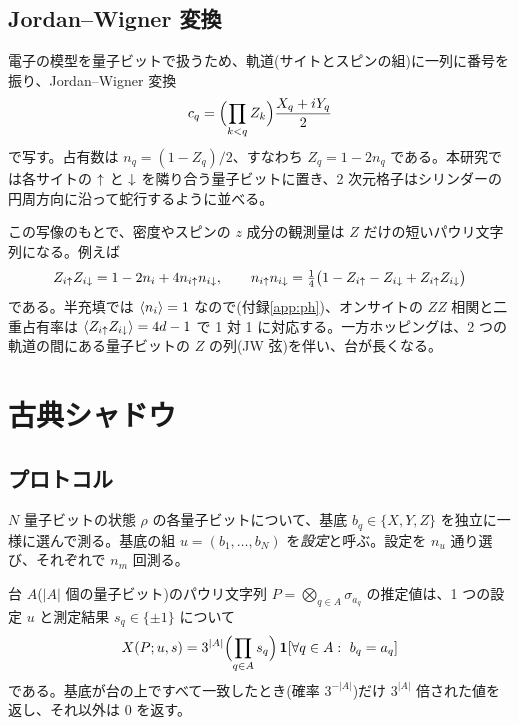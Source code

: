 \subsection{Jordan--Wigner 変換}
\label{sec:jw}
電子の模型を量子ビットで扱うため、軌道(サイトとスピンの組)に一列に番号を振り、Jordan--Wigner 変換
\begin{equation}
  c_q=\Bigl(\prod_{k<q}Z_k\Bigr)\frac{X_q+iY_q}{2}
\end{equation}
で写す。占有数は $n_q=(1-Z_q)/2$、すなわち $Z_q=1-2n_q$ である。本研究では各サイトの $\uparrow$ と $\downarrow$ を隣り合う量子ビットに置き、2 次元格子はシリンダーの円周方向に沿って蛇行するように並べる。

この写像のもとで、密度やスピンの $z$ 成分の観測量は $Z$ だけの短いパウリ文字列になる。例えば
\begin{equation}
  Z_{i\uparrow}Z_{i\downarrow}=1-2n_i+4n_{i\uparrow}n_{i\downarrow},\qquad
  n_{i\uparrow}n_{i\downarrow}=\tfrac14\bigl(1-Z_{i\uparrow}-Z_{i\downarrow}+Z_{i\uparrow}Z_{i\downarrow}\bigr)
  \label{eq:docc-pauli}
\end{equation}
である。半充填では $\langle n_i\rangle=1$ なので(付録\ref{app:ph})、オンサイトの $ZZ$ 相関と二重占有率は $\langle Z_{i\uparrow}Z_{i\downarrow}\rangle=4d-1$ で 1 対 1 に対応する。一方ホッピングは、2 つの軌道の間にある量子ビットの $Z$ の列(JW 弦)を伴い、台が長くなる。

\section{古典シャドウ}
\label{sec:shadow}

\subsection{プロトコル}
$N$ 量子ビットの状態 $\rho$ の各量子ビットについて、基底 $b_q\in\{X,Y,Z\}$ を独立に一様に選んで測る。基底の組 $u=(b_1,\dots,b_N)$ を\emph{設定}と呼ぶ。設定を $n_u$ 通り選び、それぞれで $n_m$ 回測る。

台 $A$($\lvert A\rvert$ 個の量子ビット)のパウリ文字列 $P=\bigotimes_{q\in A}\sigma_{a_q}$ の推定値は、1 つの設定 $u$ と測定結果 $s_q\in\{\pm1\}$ について
\begin{equation}
  X(P;u,s)=3^{\lvert A\rvert}\Bigl(\prod_{q\in A}s_q\Bigr)\,\mathbf 1[\forall q\in A:\ b_q=a_q]
  \label{eq:snapshot}
\end{equation}
である。基底が台の上ですべて一致したとき(確率 $3^{-\lvert A\rvert}$)だけ $3^{\lvert A\rvert}$ 倍された値を返し、それ以外は $0$ を返す。

